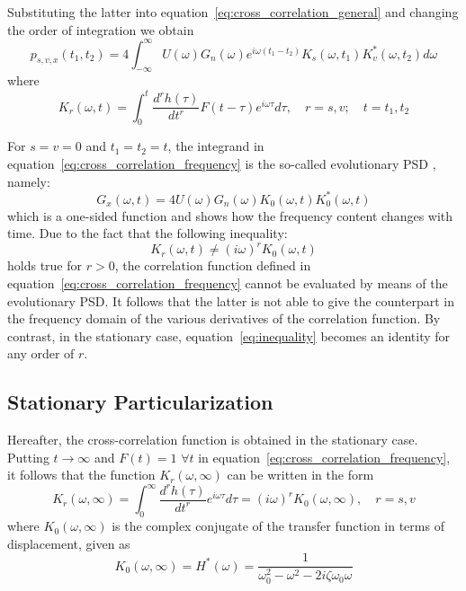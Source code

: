 \documentclass[11pt]{article}
\begin{document}
Substituting the latter into equation~\eqref{eq:cross_correlation_general} and changing the order of integration we obtain
\begin{equation}
p_{s,v,x}(t_1, t_2) = 4 \int_{-\infty}^{\infty} U(\omega) G_n(\omega) e^{i\omega(t_1-t_2)} K_s(\omega, t_1) K_v^*(\omega, t_2) d\omega
\label{eq:cross_correlation_frequency}
\end{equation}
where
\begin{equation}
K_r(\omega, t) = \int_0^t \frac{d^r h(\tau)}{dt^r} F(t - \tau) e^{i\omega\tau} d\tau, \quad r = s,v; \quad t = t_1, t_2
\label{eq:k_function}
\end{equation}

For $s = v = 0$ and $t_1 = t_2 = t$, the integrand in equation~\eqref{eq:cross_correlation_frequency} is the so-called evolutionary PSD \cite{corotis1977,corotis1972,grossmayer1977}, namely:
\begin{equation}
G_x(\omega, t) = 4U(\omega) G_n(\omega) K_0(\omega, t) K_0^*(\omega, t)
\label{eq:evolutionary_psd}
\end{equation}
which is a one-sided function and shows how the frequency content changes with time. Due to the fact that the following inequality:
\begin{equation}
K_r(\omega, t) \neq (i\omega)^r K_0(\omega, t)
\label{eq:inequality}
\end{equation}
holds true for $r > 0$, the correlation function defined in equation~\eqref{eq:cross_correlation_frequency} cannot be evaluated by means of the evolutionary PSD. It follows that the latter is not able to give the counterpart in the frequency domain of the various derivatives of the correlation function. By contrast, in the stationary case, equation~\eqref{eq:inequality} becomes an identity for any order of $r$.

\subsection{Stationary Particularization}
\label{sec:stationary_particularization}

Hereafter, the cross-correlation function is obtained in the stationary case. Putting $t \to \infty$ and $F(t) = 1$ $\forall t$ in equation~\eqref{eq:cross_correlation_frequency}, it follows that the function $K_r(\omega, \infty)$ can be written in the form
\begin{equation}
K_r(\omega, \infty) = \int_0^{\infty} \frac{d^r h(\tau)}{dt^r} e^{i\omega\tau} d\tau = (i\omega)^r K_0(\omega, \infty), \quad r = s,v
\label{eq:stationary_k}
\end{equation}
where $K_0(\omega, \infty)$ is the complex conjugate of the transfer function in terms of displacement, given as
\begin{equation}
K_0(\omega, \infty) = H^*(\omega) = \frac{1}{\omega_0^2 - \omega^2 - 2i\zeta\omega_0\omega}
\label{eq:transfer_function}
\end{equation}
\end{document}
